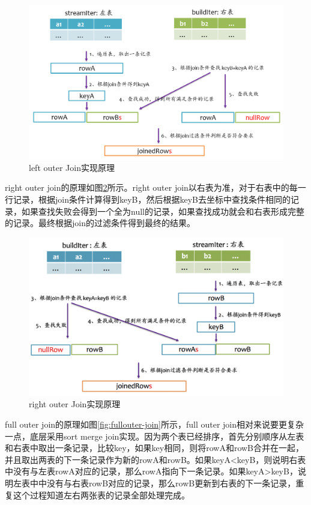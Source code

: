 \begin{figure}[htbp]
    \centering
    \includegraphics[width=1\textwidth]{Img/spark-sql-leftouter-join.png}
    \caption{left outer Join实现原理}
    \label{fig:leftouter-join}
\end{figure}

right outer join的原理如图\ref{fig:rightouter-join}所示。right outer join以右表为准，对于右表中的每一行记录，根据join条件计算得到keyB，然后根据keyB去坐标中查找条件相同的记录，如果查找失败会得到一个全为null的记录，如果查找成功就会和右表形成完整的记录。最终根据join的过滤条件得到最终的结果。

\begin{figure}[htbp]
    \centering
    \includegraphics[width=1\textwidth]{Img/spark-sql-rightouter-join.png}
    \caption{right outer Join实现原理}
    \label{fig:rightouter-join}
\end{figure}


full outer join的原理如图\ref{fig:fullouter-join}所示，full outer join相对来说要更复杂一点，底层采用sort merge join实现。因为两个表已经排序，首先分别顺序从左表和右表中取出一条记录，比较key，如果key相同，则将rowA和rowB合并在一起，并且取出两表的下一条记录作为新的rowA和rowB。如果keyA<keyB，则说明右表中没有与左表rowA对应的记录，那么rowA指向下一条记录。如果keyA>keyB，说明左表中中没有与右表rowB对应的记录，那么rowB更新到右表的下一条记录，重复这个过程知道左右两张表的记录全部处理完成。

